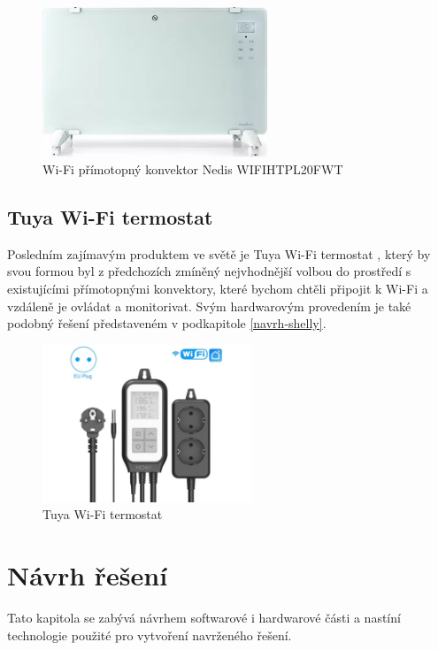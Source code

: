 \begin{figure}[hbt]
\centering
\includegraphics[width=0.6\textwidth]{obrazky-figures/nedis.png}
\caption{Wi-Fi přímotopný konvektor Nedis WIFIHTPL20FWT}
\end{figure}


\section{Tuya Wi-Fi termostat}
Posledním zajímavým produktem ve světě je Tuya Wi-Fi termostat \cite{tuyaterm}, který by svou formou byl z předchozích zmíněný nejvhodnější volbou do prostředí s existujícími přímotopnými konvektory, které bychom chtěli připojit k Wi-Fi a vzdáleně je ovládat a monitorivat. Svým hardwarovým provedením je také podobný řešení představeném v podkapitole \ref{navrh-shelly}.

\begin{figure}[hbt]
\centering
\includegraphics[width=0.56\textwidth]{obrazky-figures/tuyaterm.png}
\caption{Tuya Wi-Fi termostat}
\end{figure}


\chapter{Návrh řešení}
\label{navrh}
Tato kapitola se zabývá návrhem softwarové i hardwarové části a nastíní technologie použité pro vytvoření navrženého řešení.

